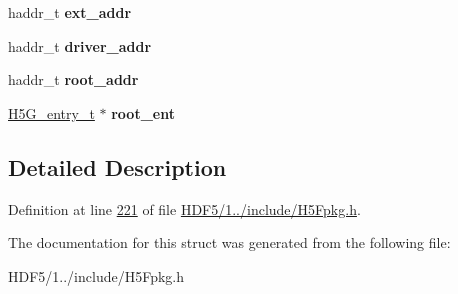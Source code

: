 \begin{DoxyCompactItemize}
haddr\+\_\+t {\bfseries ext\+\_\+addr}
\item 
\mbox{\label{struct_h5_f__super__t_a531dfe9ae0fbd28e514c27dd48ec9640}} 
haddr\+\_\+t {\bfseries driver\+\_\+addr}
\item 
\mbox{\label{struct_h5_f__super__t_a5681cab1f34d3c23fe4c3c787d695c07}} 
haddr\+\_\+t {\bfseries root\+\_\+addr}
\item 
\mbox{\label{struct_h5_f__super__t_a081a41d34fa66ce89311c1d73f527fac}} 
\hyperlink{struct_h5_g__entry__t}{H5\+G\+\_\+entry\+\_\+t} $\ast$ {\bfseries root\+\_\+ent}
\end{DoxyCompactItemize}


\subsection{Detailed Description}


Definition at line \hyperlink{_h_d_f5_21_810_81_2include_2_h5_fpkg_8h_source_l00221}{221} of file \hyperlink{_h_d_f5_21_810_81_2include_2_h5_fpkg_8h_source}{H\+D\+F5/1../include/\+H5\+Fpkg.\+h}.



The documentation for this struct was generated from the following file\+:\begin{DoxyCompactItemize}
\item 
H\+D\+F5/1../include/\+H5\+Fpkg.\+h\end{DoxyCompactItemize}
